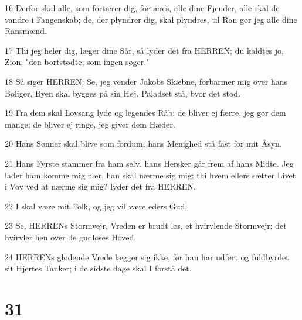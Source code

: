 \par 16 Derfor skal alle, som fortærer dig, fortæres, alle dine Fjender, alle skal de vandre i Fangenskab; de, der plyndrer dig, skal plyndres, til Ran gør jeg alle dine Ransmænd.
\par 17 Thi jeg heler dig, læger dine Sår, så lyder det fra HERREN; du kaldtes jo, Zion, "den bortstødte, som ingen søger."
\par 18 Så siger HERREN: Se, jeg vender Jakobs Skæbne, forbarmer mig over hans Boliger, Byen skal bygges på sin Høj, Paladset stå, bvor det stod.
\par 19 Fra dem skal Lovsang lyde og legendes Råb; de bliver ej færre, jeg gør dem mange; de bliver ej ringe, jeg giver dem Hæder.
\par 20 Hans Sønner skal blive som fordum, hans Menighed stå fast for mit Åsyn.
\par 21 Hans Fyrste stammer fra ham selv, hans Hersker går frem af hans Midte. Jeg lader ham komme mig nær, han skal nærme sig mig; thi hvem ellers sætter Livet i Vov ved at nærme sig mig? lyder det fra HERREN.
\par 22 I skal være mit Folk, og jeg vil være eders Gud.
\par 23 Se, HERRENs Stormvejr, Vreden er brudt løs, et hvirvlende Stormvejr; det hvirvler hen over de gudløses Hoved.
\par 24 HERRENs glødende Vrede lægger sig ikke, før han har udført og fuldbyrdet sit Hjertes Tanker; i de sidste dage skal I forstå det.

\chapter{31}

